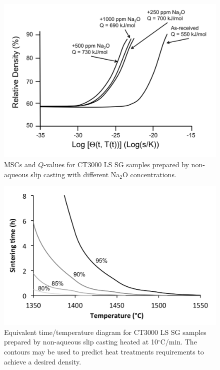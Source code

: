 \newpage
\begin{figure}[H]
	\centering
	\includegraphics[width=\textwidth]{Chapter-6/Figures/Figure10.png}
	\caption{MSCs and $Q$-values for CT3000 LS SG samples prepared by non-aqueous slip casting with different Na$_{2}$O concentrations.}
	\label{Ch6-figure:Figure10}
\end{figure}

\newpage
\begin{figure}[H]
	\centering
	\includegraphics[width=\textwidth]{Chapter-6/Figures/Figure11.png}
	\caption{Equivalent time/temperature diagram for CT3000 LS SG samples prepared by non-aqueous slip casting heated at 10$^{\circ}$C/min. The contours may be used to predict heat treatments requirements to achieve a desired density.}
	\label{Ch6-figure:Figure11}
\end{figure}
